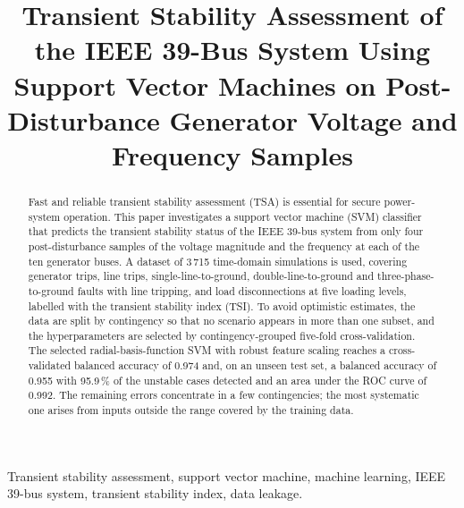 \documentclass[conference]{IEEEtran}
\begin{document}
\title{Transient Stability Assessment of the IEEE 39-Bus System Using Support Vector Machines on Post-Disturbance
Generator Voltage and Frequency Samples}

\author{
\and
{}
}

\maketitle

\begin{abstract}
Fast and reliable transient stability assessment (TSA) is essential for secure power-system operation. This paper
investigates a support vector machine (SVM) classifier that predicts the transient stability status of the IEEE
39-bus system from only four post-disturbance samples of the voltage magnitude and the frequency at each of the ten
generator buses. A dataset of 3\,715 time-domain simulations is used, covering generator trips, line trips,
single-line-to-ground, double-line-to-ground and three-phase-to-ground faults with line tripping, and load
disconnections at five loading levels, labelled with the transient stability index (TSI). To avoid optimistic
estimates, the data are split by contingency so that no scenario appears in more than one subset, and the
hyperparameters are selected by contingency-grouped five-fold cross-validation. The selected radial-basis-function
SVM with robust feature scaling reaches a cross-validated balanced accuracy of 0.974 and, on an unseen test set, a
balanced accuracy of 0.955 with 95.9\,\% of the unstable cases detected and an area under the ROC curve of 0.992.
The remaining errors concentrate in a few contingencies; the most systematic one arises from inputs outside the
range covered by the training data.
\end{abstract}

\begin{IEEEkeywords}
Transient stability assessment, support vector machine, machine learning, IEEE 39-bus system, transient stability
index, data leakage.
\end{IEEEkeywords}
\end{document}
